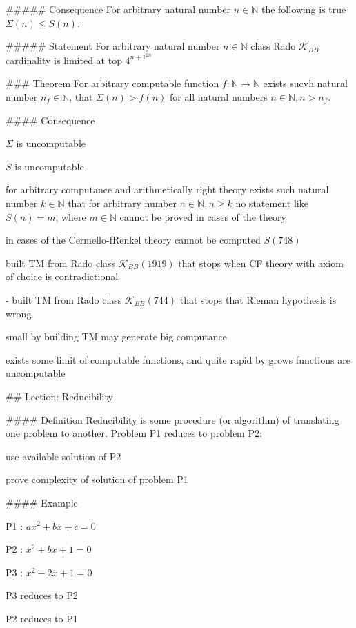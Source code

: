 \documentclass[12pt,letterpaper]{report}
\begin{document}
##### Consequence
For arbitrary natural number $n \in \mathbb{N}$ the following is true $\Sigma(n) \leq S(n)$.

##### Statement
For arbitrary natural number $n \in \mathbb{N}$ class Rado $\mathcal{K}_{BB}$ cardinality is limited at top $4^{n + 1}^{2n}$

### Theorem 
For arbitrary computable function $f : \mathbb{N} \rightarrow \mathbb{N}$ exists sucvh natural number $n_f \in \mathbb{N}$, that $\Sigma(n) > f(n)$ for all natural numbers $n \in \mathbb{N}, n > n_f$.

#### Consequence
\item $\Sigma$ is uncomputable
\item $S$ is uncomputable

\item for arbitrary computance and arithmetically right theory exists such natural number $k \in \mathbb{N}$ that for arbitrary number $n \in \mathbb{N}, n \geq k$ no statement like $S(n) = m$, where $m \in \mathbb{N}$ cannot be proved in cases of the theory
\item in cases of the Cermello-fRenkel theory cannot be computed $S(748)$
\item built TM from Rado class $\mathcal{K}_{BB}(1919)$ that stops when CF theory with axiom of choice is contradictional
\item - built TM from Rado class $\mathcal{K}_{BB}(744)$ that stops that Rieman hypothesis is wrong

\item small by building TM may generate big computance
\item exists some limit of computable functions, and quite rapid by grows functions are uncomputable

## Lection: Reducibility

#### Definition
Reducibility is some procedure (or algorithm) of translating one problem to another.
Problem P1 reduces to problem P2:
\item use available solution of P2
\item prove complexity of solution of problem P1


#### Example
\item P1 : $ax^2 + bx + c = 0$
\item P2 : $x^2 + bx + 1 = 0$
\item P3 : $x^2 -2x+1=0$
\item P3 reduces to P2
\item P2 reduces to P1
\end{document}
